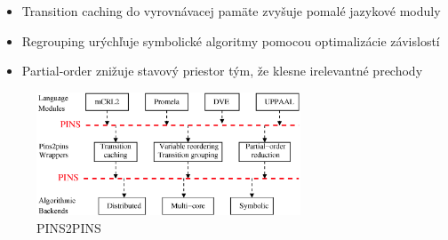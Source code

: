 \begin{itemize}
	\item Transition caching do vyrovnávacej pamäte zvyšuje pomalé jazykové moduly
	\item Regrouping urýchľuje symbolické algoritmy pomocou optimalizácie závislostí
	\item Partial-order znižuje stavový priestor tým, že klesne irelevantné prechody
\end{itemize}

\begin{figure}[ht]
\centerline{\includegraphics[width=0.7\textwidth]{images/pins2pins}}
\caption[PINS2PINS]{PINS2PINS}
\label{obr:pins2pins}
\end{figure}